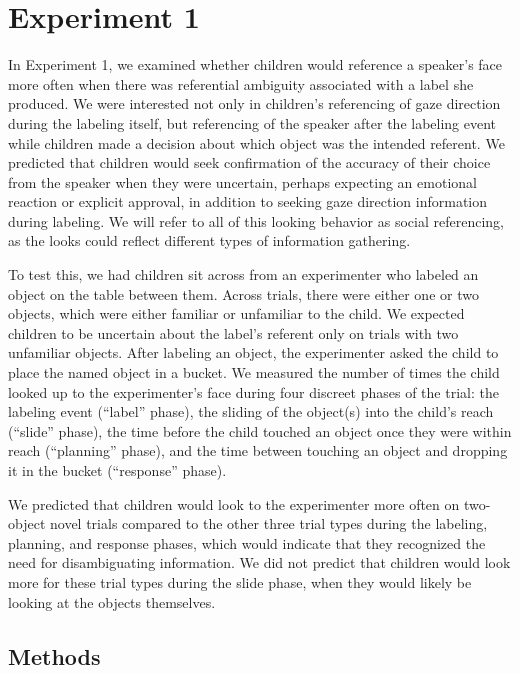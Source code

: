 \documentclass[10pt, letterpaper]{article}
\begin{document}
\section{Experiment 1}\label{experiment-1}

In Experiment 1, we examined whether children would reference a
speaker's face more often when there was referential ambiguity
associated with a label she produced. We were interested not only in
children's referencing of gaze direction during the labeling itself, but
referencing of the speaker after the labeling event while children made
a decision about which object was the intended referent. We predicted
that children would seek confirmation of the accuracy of their choice
from the speaker when they were uncertain, perhaps expecting an
emotional reaction or explicit approval, in addition to seeking gaze
direction information during labeling. We will refer to all of this
looking behavior as social referencing, as the looks could reflect
different types of information gathering.

To test this, we had children sit across from an experimenter who
labeled an object on the table between them. Across trials, there were
either one or two objects, which were either familiar or unfamiliar to
the child. We expected children to be uncertain about the label's
referent only on trials with two unfamiliar objects. After labeling an
object, the experimenter asked the child to place the named object in a
bucket. We measured the number of times the child looked up to the
experimenter's face during four discreet phases of the trial: the
labeling event (``label'' phase), the sliding of the object(s) into the
child's reach (``slide'' phase), the time before the child touched an
object once they were within reach (``planning'' phase), and the time
between touching an object and dropping it in the bucket (``response''
phase).

We predicted that children would look to the experimenter more often on
two-object novel trials compared to the other three trial types during
the labeling, planning, and response phases, which would indicate that
they recognized the need for disambiguating information. We did not
predict that children would look more for these trial types during the
slide phase, when they would likely be looking at the objects
themselves.

\subsection{Methods}\label{methods}
\end{document}
